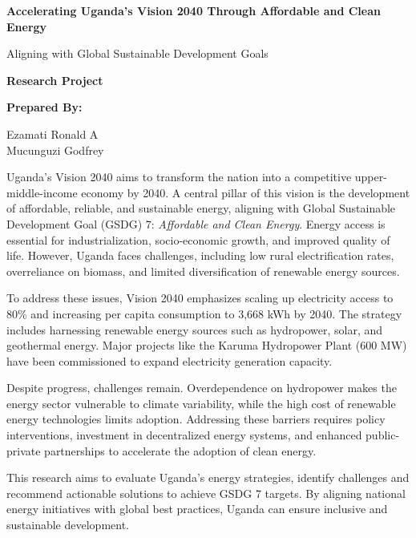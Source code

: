 \documentclass[12pt]{article}
\begin{document}
\begin{titlepage}
    \centering
    \vspace*{1.5cm}
    \Huge
    \textbf{Accelerating Uganda's Vision 2040 Through Affordable and Clean Energy}
    
    \vspace{1.5cm}
    \LARGE
    Aligning with Global Sustainable Development Goals
    
    \vspace{2cm}
    \Large
    \textbf{Research Project}

    \vspace{2.5cm}
    \Large
    \textbf{Prepared By:}
    
    \vspace{0.5cm}
    \large
    Ezamati Ronald A\\
    Mucunguzi Godfrey\\
    \date{\today}

    \vspace*{1cm}
\end{titlepage}

Uganda's Vision 2040 aims to transform the nation into a competitive upper-middle-income economy by 2040. A central pillar of this vision is the development of affordable, reliable, and sustainable energy, aligning with Global Sustainable Development Goal (GSDG) 7: \textit{Affordable and Clean Energy}. Energy access is essential for industrialization, socio-economic growth, and improved quality of life. However, Uganda faces challenges, including low rural electrification rates, overreliance on biomass, and limited diversification of renewable energy sources.

To address these issues, Vision 2040 emphasizes scaling up electricity access to 80\% and increasing per capita consumption to 3,668 kWh by 2040. The strategy includes harnessing renewable energy sources such as hydropower, solar, and geothermal energy. Major projects like the Karuma Hydropower Plant (600 MW) have been commissioned to expand electricity generation capacity. 

Despite progress, challenges remain. Overdependence on hydropower makes the energy sector vulnerable to climate variability, while the high cost of renewable energy technologies limits adoption. Addressing these barriers requires policy interventions, investment in decentralized energy systems, and enhanced public-private partnerships to accelerate the adoption of clean energy.

This research aims to evaluate Uganda's energy strategies, identify challenges and recommend actionable solutions to achieve GSDG 7 targets. By aligning national energy initiatives with global best practices, Uganda can ensure inclusive and sustainable development.
\end{document}
